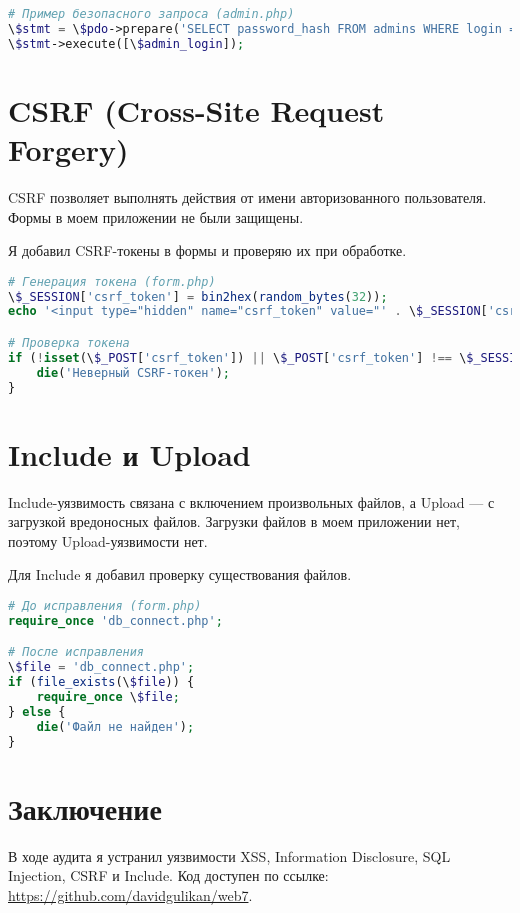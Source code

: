 \documentclass[a4paper,12pt]{article}
\begin{document}
\begin{lstlisting}[language=PHP, caption=Защита от SQL Injection]
# Пример безопасного запроса (admin.php)
\$stmt = \$pdo->prepare('SELECT password_hash FROM admins WHERE login = ?');
\$stmt->execute([\$admin_login]);
\end{lstlisting}

\section{CSRF (Cross-Site Request Forgery)}
CSRF позволяет выполнять действия от имени авторизованного пользователя. Формы в моем приложении не были защищены.

Я добавил CSRF-токены в формы и проверяю их при обработке.

\begin{lstlisting}[language=PHP, caption=Защита от CSRF]
# Генерация токена (form.php)
\$_SESSION['csrf_token'] = bin2hex(random_bytes(32));
echo '<input type="hidden" name="csrf_token" value="' . \$_SESSION['csrf_token'] . '">';

# Проверка токена
if (!isset(\$_POST['csrf_token']) || \$_POST['csrf_token'] !== \$_SESSION['csrf_token']) {
    die('Неверный CSRF-токен');
}
\end{lstlisting}

\section{Include и Upload}
Include-уязвимость связана с включением произвольных файлов, а Upload — с загрузкой вредоносных файлов. Загрузки файлов в моем приложении нет, поэтому Upload-уязвимости нет.

Для Include я добавил проверку существования файлов.

\begin{lstlisting}[language=PHP, caption=Защита от Include]
# До исправления (form.php)
require_once 'db_connect.php';

# После исправления
\$file = 'db_connect.php';
if (file_exists(\$file)) {
    require_once \$file;
} else {
    die('Файл не найден');
}
\end{lstlisting}

\section*{Заключение}
В ходе аудита я устранил уязвимости XSS, Information Disclosure, SQL Injection, CSRF и Include. Код доступен по ссылке: \url{https://github.com/davidgulikan/web7}.
\end{document}
